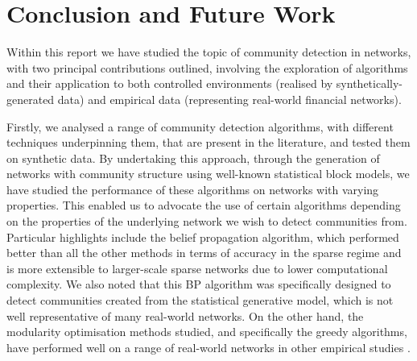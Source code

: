 
\chapter{Conclusion and Future Work}

\label{cha:Conclusion}


Within this report we have studied the topic of community detection in networks, with two principal contributions outlined, involving the exploration of algorithms and their application to both controlled environments (realised by synthetically-generated data) and empirical data (representing real-world financial networks).

Firstly, we analysed a range of community detection algorithms, with different techniques underpinning them, that are present in the literature, and tested them on synthetic data.
By undertaking this approach, through the generation of networks with community structure using well-known statistical block models, we have studied the performance of these algorithms on networks with varying properties.
This enabled us to advocate the use of certain algorithms depending on the properties of the underlying network we wish to detect communities from.
Particular highlights include the belief propagation algorithm, which performed better than all the other methods in terms of accuracy in the sparse regime and is more extensible to larger-scale sparse networks due to lower computational complexity.
We also noted that this BP algorithm was specifically designed to detect communities created from the statistical generative model, which is not well representative of many real-world networks.
On the other hand, the modularity optimisation methods studied, and specifically the greedy algorithms, have performed well on a range of real-world networks in other empirical studies \cite{For10}.

